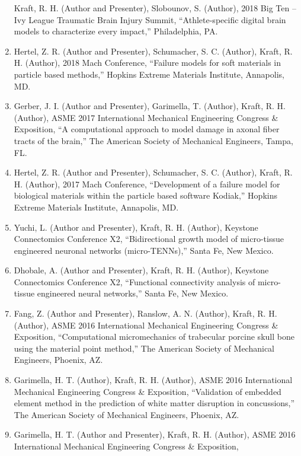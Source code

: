 \documentclass[11pt]{article}
\begin{document}
\begin{enumerate}
  Kraft, R. 
H. 
(Author and Presenter), Slobounov, S. 
(Author), 2018 Big
  Ten -- Ivy League Traumatic Brain Injury Summit, ``Athlete-specific
  digital brain models to characterize every impact,'' Philadelphia, PA.
\item
  Hertel, Z. 
R. 
(Author and Presenter), Schumacher, S. 
C. 
(Author),
  Kraft, R. 
H. 
(Author), 2018 Mach Conference, ``Failure models for soft
  materials in particle based methods,'' Hopkins Extreme Materials
  Institute, Annapolis, MD.
\item
  Gerber, J. 
I. 
(Author and Presenter), Garimella, T. 
(Author), Kraft,
  R. 
H. 
(Author), ASME 2017 International Mechanical Engineering
  Congress \& Exposition, ``A computational approach to model damage in
  axonal fiber tracts of the brain,'' The American Society of Mechanical
  Engineers, Tampa, FL.
\item
  Hertel, Z. 
R. 
(Author and Presenter), Schumacher, S. 
C. 
(Author),
  Kraft, R. 
H. 
(Author), 2017 Mach Conference, ``Development of a failure
  model for biological materials within the particle based software
  Kodiak,'' Hopkins Extreme Materials Institute, Annapolis, MD.
\item
  Yuchi, L. 
(Author and Presenter), Kraft, R. 
H. 
(Author), Keystone
  Connectomics Conference X2, ``Bidirectional growth model of
  micro-tissue engineered neuronal networks (micro-TENNs),'' Santa Fe,
  New Mexico.
\item
  Dhobale, A. 
(Author and Presenter), Kraft, R. 
H. 
(Author), Keystone
  Connectomics Conference X2, ``Functional connectivity analysis of
  micro-tissue engineered neural networks,'' Santa Fe, New Mexico.
\item
  Fang, Z. 
(Author and Presenter), Ranslow, A. 
N. 
(Author), Kraft, R. 
H.
  (Author), ASME 2016 International Mechanical Engineering Congress \&
  Exposition, ``Computational micromechanics of trabecular porcine skull
  bone using the material point method,'' The American Society of
  Mechanical Engineers, Phoenix, AZ.
\item
  Garimella, H. 
T. 
(Author), Kraft, R. 
H. 
(Author), ASME 2016
  International Mechanical Engineering Congress \& Exposition,
  ``Validation of embedded element method in the prediction of white
  matter disruption in concussions,'' The American Society of Mechanical
  Engineers, Phoenix, AZ.
\item
  Garimella, H. 
T. 
(Author and Presenter), Kraft, R. 
H. 
(Author), ASME
  2016 International Mechanical Engineering Congress \& Exposition,

\end{enumerate}
\end{document}
